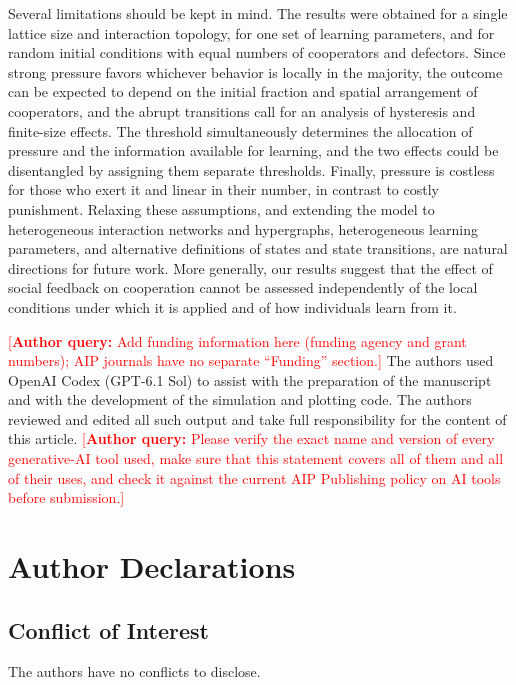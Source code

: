 \documentclass[%
  aip,cha,
  amsmath,amssymb,
  reprint,
  article-title,
]{revtex4-2}
\newcommand{\AQ}[1]{\textcolor{red}{[\textbf{Author query:} #1]}}
\begin{document}
Several limitations should be kept in mind. The results were obtained for a single lattice size and interaction topology, for one set of learning parameters, and for random initial conditions with equal numbers of cooperators and defectors. Since strong pressure favors whichever behavior is locally in the majority, the outcome can be expected to depend on the initial fraction and spatial arrangement of cooperators, and the abrupt transitions call for an analysis of hysteresis and finite-size effects. The threshold simultaneously determines the allocation of pressure and the information available for learning, and the two effects could be disentangled by assigning them separate thresholds. Finally, pressure is costless for those who exert it and linear in their number, in contrast to costly punishment.\cite{fehr2002altruistic,chen2014probabilistic} Relaxing these assumptions, and extending the model to heterogeneous interaction networks and hypergraphs,\cite{shi2024model} heterogeneous learning parameters,\cite{lee2025granular} and alternative definitions of states and state transitions,\cite{guo2022effect} are natural directions for future work. More generally, our results suggest that the effect of social feedback on cooperation cannot be assessed independently of the local conditions under which it is applied and of how individuals learn from it.


\begin{acknowledgments}
\AQ{Add funding information here (funding agency and grant numbers); AIP journals have no separate ``Funding'' section.}
The authors used OpenAI Codex (GPT-6.1 Sol) to assist with the preparation of the manuscript and with the development of the simulation and plotting code. The authors reviewed and edited all such output and take full responsibility for the content of this article. \AQ{Please verify the exact name and version of every generative-AI tool used, make sure that this statement covers all of them and all of their uses, and check it against the current AIP Publishing policy on AI tools before submission.}
\end{acknowledgments}

\section*{Author Declarations}

\subsection*{Conflict of Interest}
The authors have no conflicts to disclose.
\end{document}

